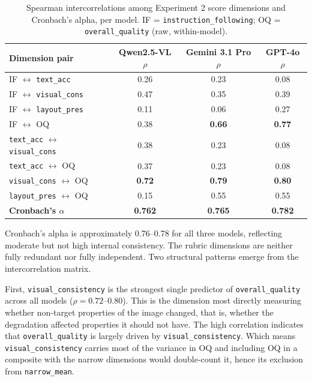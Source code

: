 \begin{table}[htbp]
\centering
\caption{Spearman intercorrelations among Experiment 2 score dimensions and Cronbach's alpha, per model. IF = \texttt{instruction\_following}; OQ = \texttt{overall\_quality} (raw, within-model).}
\label{tab:intercorrelations}
\begin{tabular}{lccc}
\toprule
Dimension pair & Qwen2.5-VL $\rho$ & Gemini 3.1 Pro $\rho$ & GPT-4o $\rho$ \\
\midrule
IF $\leftrightarrow$ \texttt{text\_acc}          & 0.26 & 0.23 & 0.08 \\
IF $\leftrightarrow$ \texttt{visual\_cons}       & 0.47 & 0.35 & 0.39 \\
IF $\leftrightarrow$ \texttt{layout\_pres}       & 0.11 & 0.06 & 0.27 \\
IF $\leftrightarrow$ OQ                          & 0.38 & \textbf{0.66} & \textbf{0.77} \\
\texttt{text\_acc} $\leftrightarrow$ \texttt{visual\_cons}  & 0.38 & 0.23 & 0.08 \\
\texttt{text\_acc} $\leftrightarrow$ OQ          & 0.37 & 0.23 & 0.08 \\
\texttt{visual\_cons} $\leftrightarrow$ OQ       & \textbf{0.72} & \textbf{0.79} & \textbf{0.80} \\
\texttt{layout\_pres} $\leftrightarrow$ OQ       & 0.15 & 0.55 & 0.55 \\
\midrule
\textbf{Cronbach's $\alpha$}                     & \textbf{0.762} & \textbf{0.765} & \textbf{0.782} \\
\bottomrule
\end{tabular}
\end{table}

Cronbach's alpha is approximately 0.76--0.78 for all three models, reflecting moderate but not high internal consistency. The rubric dimensions are neither fully redundant nor fully independent. Two structural patterns emerge from the intercorrelation matrix.

First, \texttt{visual\_consistency} is the strongest single predictor of \texttt{overall\_quality} across all models ($\rho = 0.72$--0.80). This is the dimension most directly measuring whether non-target properties of the image changed, that is, whether the degradation affected properties it should not have. The high correlation indicates that \texttt{overall\_quality} is largely driven by \texttt{visual\_consistency}. Which means \texttt{visual\_consistency} carries most of the variance in OQ and including OQ in a composite with the narrow dimensions would double-count it, hence its exclusion from \texttt{narrow\_mean}.

